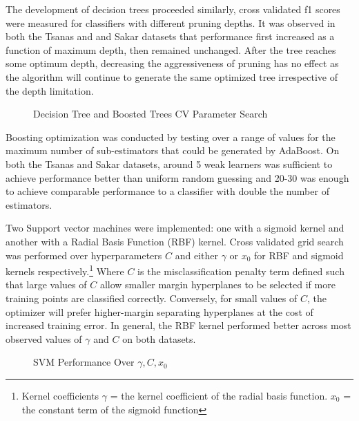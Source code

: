 \documentclass[12pt]{article}
\begin{document}
The development of decision trees proceeded similarly, cross validated f1 scores were measured for classifiers with different pruning depths. It was observed in both the Tsanas and and Sakar datasets that performance first increased as a function of maximum depth, then remained unchanged. After the tree reaches some optimum depth, decreasing the aggressiveness of pruning has no effect as the algorithm will continue to generate the same optimized tree irrespective of the depth limitation.
\begin{figure}%
    \centering
    \qquad
    \caption{Decision Tree and Boosted Trees CV Parameter Search}
\end{figure}

Boosting optimization was conducted by testing over a range of values for the maximum number of sub-estimators that could be generated by AdaBoost. On both the Tsanas and Sakar datasets, around 5 weak learners was sufficient to achieve performance better than uniform random guessing and 20-30 was enough to achieve comparable performance to a classifier with double the number of estimators.

Two Support vector machines were implemented: one with a sigmoid kernel and another with a Radial Basis Function (RBF) kernel. Cross validated grid search was performed over hyperparameters $C$ and either $\gamma$ or $x_0$ for RBF and sigmoid kernels respectively.\footnote{Kernel coefficients $\gamma$ = the kernel coefficient of the radial basis function. $x_0$ = the constant term of the sigmoid function} Where $C$ is the misclassification penalty term defined such that large values of $C$ allow smaller margin hyperplanes to be selected if more training points are classified correctly. Conversely, for small values of $C$, the optimizer will prefer higher-margin separating hyperplanes at the cost of increased training error. In general, the RBF kernel performed better across most observed values of $\gamma$ and $C$ on both datasets.

\begin{figure}%
    \centering
    \qquad
    \caption{SVM Performance Over $\gamma, C, x_0$}
    \label{fig:svm}%
\end{figure}
\end{document}

